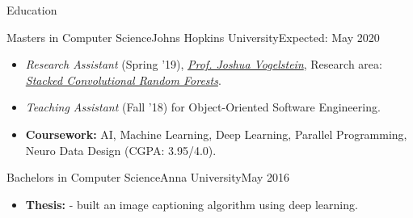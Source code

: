 \documentclass[]{mcdowellcv}
\begin{document}
	\makeheader


\begin{cvsection}{Education}
		\begin{cvsubsection}{Masters in Computer Science}{Johns Hopkins University}{Expected: May 2020}
			\begin{itemize}
				\item \textit{Research Assistant} (Spring '19), \href{https://jovo.me/}{\color{blue!70}\textit{Prof. Joshua Vogelstein}}, Research area: \href{https://github.com/tpsatish95/deep-conv-rf}{\color{blue!70}\textit{Stacked Convolutional Random Forests}}.
				\item \textit{Teaching Assistant} (Fall '18) for Object-Oriented Software Engineering.
				\item \textbf{Coursework:} AI, Machine Learning, Deep Learning, Parallel Programming, Neuro Data Design (CGPA: 3.95/4.0).
			\end{itemize}
		\end{cvsubsection}
		\begin{cvsubsection}{Bachelors in Computer Science}{Anna University}{May 2016}
			\begin{itemize}
				\item \textbf{Thesis:} \href{https://github.com/tpsatish95/image-captioning}{} - built an image captioning algorithm using deep learning.
			\end{itemize}
		\end{cvsubsection}
	\end{cvsection}
\end{document}
